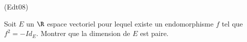 \begin{tiny}(Edt08)\end{tiny}
Soit $E$ un $\R$ espace vectoriel pour lequel existe un endomorphisme $f$ tel que $f^{2}=-Id_{E}$. Montrer que la dimension de $E$ est paire.